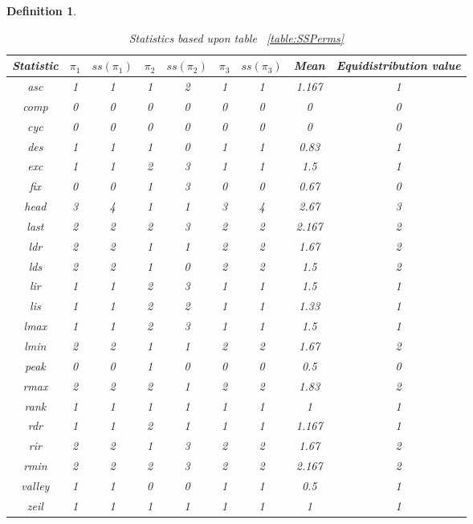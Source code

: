 \documentclass[12pt]{article}
\newtheorem{definition}{Definition}
\begin{document}
\begin{definition}
\begin{table}[H]
\caption{Statistics based upon table ~\ref{table:SSPerms}}
\centering
\begin{tabular}{c | c c c c c c c | c}
\hline\hline
Statistic & $\pi_1$ & $ss(\pi_1)$ & $\pi_2$ & $ss(\pi_2)$ & $\pi_3$ & $ss(\pi_3)$ & Mean & Equidistribution value\\ [0.5ex]
\hline
asc & 1 & 1 & 1 & 2 & 1 & 1 & 1.167 & 1\\ 
comp & 0 & 0 & 0 & 0 & 0 & 0 & 0 & 0\\
cyc & 0 & 0 & 0 & 0 & 0 & 0 & 0 & 0\\
des & 1 & 1 & 1 & 0 & 1 & 1 & 0.83 & 1\\
exc & 1 & 1 & 2 & 3 & 1 & 1 & 1.5 & 1\\
fix & 0 & 0 & 1 & 3 & 0 & 0 & 0.67 & 0\\
head & 3 & 4 & 1 & 1 & 3 & 4 & 2.67 & 3\\
last & 2 & 2 & 2 & 3 & 2 & 2 & 2.167 & 2\\
ldr & 2 & 2 & 1 & 1 & 2 & 2 & 1.67 & 2\\
lds & 2 & 2 & 1 & 0 & 2 & 2 & 1.5 & 2\\
lir & 1 & 1 & 2 & 3 & 1 & 1 & 1.5 & 1\\
lis & 1 & 1 & 2 & 2 & 1 & 1 & 1.33 & 1\\
lmax & 1 & 1 & 2 & 3 & 1 & 1 & 1.5 & 1\\
lmin & 2 & 2 & 1 & 1 & 2 & 2 & 1.67 & 2\\
peak & 0 & 0 & 1 & 0 & 0 & 0 & 0.5 & 0\\
rmax & 2 & 2 & 2 & 1 & 2 & 2 & 1.83 & 2\\
rank & 1 & 1 & 1 & 1 & 1 & 1 & 1 & 1\\
rdr & 1 & 1 & 2 & 1 & 1 & 1 & 1.167 & 1\\
rir & 2 & 2 & 1 & 3 & 2 & 2 & 1.67 & 2\\
rmin & 2 & 2 & 2 & 3 & 2 & 2 & 2.167 & 2\\
valley & 1 & 1 & 0 & 0 & 1 & 1 & 0.5 & 1\\
zeil & 1 & 1 & 1 & 1 & 1 & 1 & 1 & 1\\
\hline
\end{tabular}
\label{table:SSPerms1}

\end{table}
\end{definition}
\end{document}

